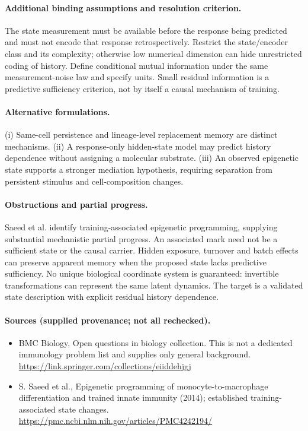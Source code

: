 \documentclass[11pt]{article}
\begin{document}
\paragraph{Additional binding assumptions and resolution criterion.} The state measurement must be available before the response being predicted and must not encode that response retrospectively. Restrict the state/encoder class and its complexity; otherwise low numerical dimension can hide unrestricted coding of history. Define conditional mutual information under the same measurement-noise law and specify units. Small residual information is a predictive sufficiency criterion, not by itself a causal mechanism of training.

\paragraph{Alternative formulations.} (i) Same-cell persistence and lineage-level replacement memory are distinct mechanisms. (ii) A response-only hidden-state model may predict history dependence without assigning a molecular substrate. (iii) An observed epigenetic state supports a stronger mediation hypothesis, requiring separation from persistent stimulus and cell-composition changes.
\paragraph{Obstructions and partial progress.} Saeed et al. identify training-associated epigenetic programming, supplying substantial mechanistic partial progress. An associated mark need not be a sufficient state or the causal carrier. Hidden exposure, turnover and batch effects can preserve apparent memory when the proposed state lacks predictive sufficiency. No unique biological coordinate system is guaranteed: invertible transformations can represent the same latent dynamics. The target is a validated state description with explicit residual history dependence.
\paragraph{Sources (supplied provenance; not all rechecked).}
\begin{itemize}
\item BMC Biology, Open questions in biology collection. This is not a dedicated immunology problem list and supplies only general background. \url{https://link.springer.com/collections/eiiddehjgj}
\item S. Saeed et al., Epigenetic programming of monocyte-to-macrophage differentiation and trained innate immunity (2014); established training-associated state changes. \url{https://pmc.ncbi.nlm.nih.gov/articles/PMC4242194/}
\end{itemize}
\end{document}
